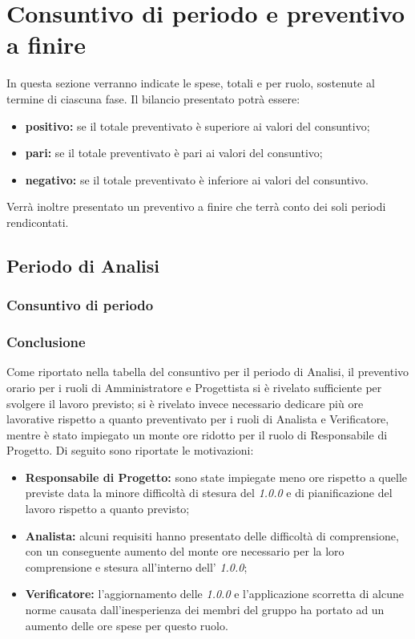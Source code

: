 \section{Consuntivo di periodo e preventivo a finire}
In questa sezione verranno indicate le spese, totali e per ruolo, sostenute al termine di ciascuna fase.
Il bilancio presentato potrà essere:
\begin{itemize}
	\item \textbf{positivo:} se il totale preventivato è superiore ai valori del consuntivo;
	\item \textbf{pari:} se il totale preventivato è pari ai valori del consuntivo;
	\item \textbf{negativo:} se il totale preventivato è inferiore ai valori del consuntivo.
\end{itemize}
Verrà inoltre presentato un preventivo a finire che terrà conto dei soli periodi rendicontati.

\subsection{Periodo di Analisi}
\subsubsection{Consuntivo di periodo}


\subsubsection{Conclusione}
Come riportato nella tabella del consuntivo per il periodo di Analisi, il preventivo orario per i ruoli di Amministratore e Progettista si è rivelato sufficiente per svolgere il lavoro previsto; si è rivelato  invece necessario dedicare più ore lavorative rispetto a quanto preventivato per i ruoli di Analista e Verificatore, mentre è stato impiegato un monte ore ridotto per il ruolo di Responsabile di Progetto. Di seguito sono riportate le motivazioni:
\begin{itemize}
	\item \textbf{Responsabile di Progetto:} sono state impiegate meno ore rispetto a quelle previste data la minore difficoltà di stesura del \textit{\PdP{} 1.0.0} e di pianificazione del lavoro rispetto a quanto previsto;
	\item \textbf{Analista:} alcuni requisiti hanno presentato delle difficoltà di comprensione, con un conseguente aumento del monte ore necessario per la loro comprensione e stesura all'interno dell'\textit{\AdR{} 1.0.0};
	\item \textbf{Verificatore:} l'aggiornamento delle \textit{\NdP{} 1.0.0} e l'applicazione scorretta di alcune norme causata dall'inesperienza dei membri del gruppo ha portato ad un aumento delle ore spese per questo ruolo.
\end{itemize}


